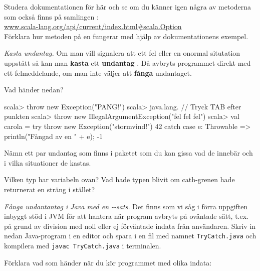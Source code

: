 \Subtask\Pen Studera dokumentationen för  här och se om du känner igen några av metoderna som också finns på samlingen :\\ \href{http://www.scala-lang.org/api/current/index.html#scala.Option}{www.scala-lang.org/api/current/index.html\#scala.Option} 
\\Förklara hur metoden  på en  fungerar med hjälp av dokumentationens exempel.



\Task \emph{Kasta undantag.} Om man vill signalera att ett fel eller en onormal situtation uppstått så kan man \textbf{kasta}  ett \textbf{undantag} . Då avbryts programmet direkt med ett felmeddelande, om man inte väljer att \textbf{fånga}  undantaget. 

\Subtask Vad händer nedan?
\begin{REPL}
scala> throw new Exception("PANG!")
scala> java.lang.   // Tryck TAB efter punkten
scala> throw new IllegalArgumentException("fel fel fel")
scala> val carola = try { 
         throw new Exception("stormvind!") 
         42
       } catch { case e: Throwable => println("Fångad av en " + e); -1 } 
\end{REPL}
\Subtask\Pen Nämn ett par undantag som finns i paketet  som du kan gissa vad de innebär och i vilka situationer de kastas.

\Subtask\Pen Vilken typ har variabeln  ovan? Vad hade typen blivit om cath-grenen hade returnerat en sträng i stället?

\Task \label{task:javatry} \emph{Fånga undantantag i Java med en --sats.} Det finns som vi såg i förra uppgiften inbyggt stöd i JVM för att hantera när program avbryts på oväntade sätt, t.ex. på grund av division med noll eller ej förväntade indata från användaren. Skriv in nedan Java-program i en editor och spara i en fil med namnet \texttt{TryCatch.java} och kompilera med \texttt{javac TryCatch.java} i terminalen. 


\Subtask Förklara vad som händer när du kör programmet med olika indata:

